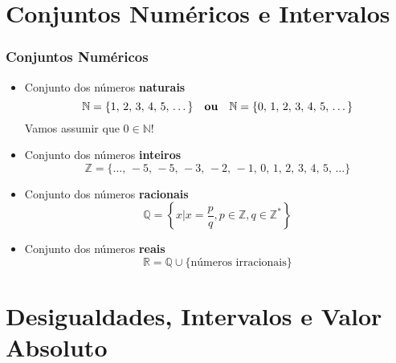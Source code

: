 \section{Conjuntos Numéricos e Intervalos}
\begin{frame}
  \frametitle{Conjuntos Numéricos}
  \begin{itemize}
    \item Conjunto dos números \textbf{naturais}
    \begin{equation*}
      \mathbb{N} = \{1,\,2,\,3,\,4,\,5,\,\dots\}\quad\mbox{\textbf{ou}}\quad \mathbb{N} = \{0,\,1,\,2,\,3,\,4,\,5,\,\dots\}
    \end{equation*} 
    Vamos assumir que $0\in\mathbb{N}$!
    \item Conjunto dos números \textbf{inteiros}
    \begin{equation*}
      \mathbb{Z} = \{\dots,\,-5,\,-5,\,-3,\,-2,\,-1,\,0,\,1,\,2,\,3,\,4,\,5,\,\dots\}
    \end{equation*}
    \item Conjunto dos números \textbf{racionais}
    \begin{equation*}
      \mathbb{Q} = \left\{x\bigl| x=\frac{p}{q}, p\in\mathbb{Z}, q\in\mathbb{Z}^{*}\right\}
    \end{equation*}
    \item Conjunto dos números \textbf{reais}
    \begin{equation*}
      \mathbb{R} = \mathbb{Q}\cup \{\mbox{números irracionais}\}
    \end{equation*}
  \end{itemize}
\end{frame}

\section{Desigualdades, Intervalos e Valor Absoluto}

